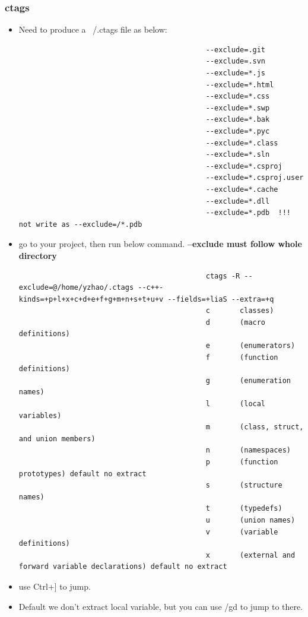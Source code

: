 \documentclass[paper=8.5in:11in, twoside, 12pt, pagesize=pdftex]{book}
\begin{document}
									\subsubsection{ctags}
									\begin{itemize}
										\item Need to produce a ~/.ctags file as below: 
										\begin{verbatim}
											--exclude=.git
											--exclude=.svn
											--exclude=*.js
											--exclude=*.html
											--exclude=*.css
											--exclude=*.swp
											--exclude=*.bak
											--exclude=*.pyc
											--exclude=*.class
											--exclude=*.sln
											--exclude=*.csproj
											--exclude=*.csproj.user
											--exclude=*.cache
											--exclude=*.dll
											--exclude=*.pdb	 !!! not write as --exclude=/*.pdb
										\end{verbatim}
										
										\item go to your project, then run below command. \textbf{--exclude must follow whole directory}
										\begin{verbatim}
											ctags -R --exclude=@/home/yzhao/.ctags --c++-kinds=+p+l+x+c+d+e+f+g+m+n+s+t+u+v --fields=+liaS --extra=+q
											c       classes)
											d       (macro definitions)
											e       (enumerators)
											f       (function definitions)
											g       (enumeration names)
											l       (local variables) 
											m       (class, struct, and union members)
											n       (namespaces)
											p       (function prototypes) default no extract
											s       (structure names)
											t       (typedefs)
											u       (union names)
											v       (variable definitions)
											x       (external and forward variable declarations) default no extract
										\end{verbatim}
										\item use Ctrl+] to jump. 
										\item Default we don't extract local variable, but you can use /gd to jump to there.
										
									\end{itemize}
									
\end{document}
